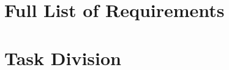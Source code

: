 \chapter{Full List of Requirements}
\setlength{\parindent}{15pt}
\label{ch:full_list_requ}


\chapter{Task Division}
\setlength{\parindent}{15pt}
\label{ch:task_divi}

